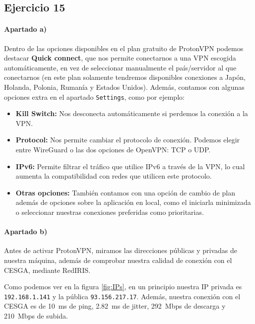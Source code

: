\subsection{Ejercicio 15}
\graphicspath{ {img/15} }

\paragraph{Apartado a)} Dentro de las opciones disponibles en el plan gratuito de ProtonVPN podemos destacar \textbf{Quick connect}, que nos permite conectarnos a una VPN escogida automáticamente, en vez de seleccionar manualmente el país/servidor al que conectarnos (en este plan solamente tendremos disponibles conexiones a Japón, Holanda, Polonia, Rumanía y Estados Unidos). Además, contamos con algunas opciones extra en el apartado \texttt{Settings}, como por ejemplo:

\begin{tcolorbox}[
    colback=orange!5!white,
    colframe=orange!75!black,
    title=Opciones relevantes en ProtonVPN
]
\begin{itemize}
    \item \textbf{Kill Switch:} Nos desconecta automáticamente si perdemos la conexión a la VPN.
    \item \textbf{Protocol:} Nos permite cambiar el protocolo de conexión. Podemos elegir entre WireGuard o las dos opciones de OpenVPN: TCP o UDP.
    \item \textbf{IPv6:} Permite filtrar el tráfico que utilice IPv6 a través de la VPN, lo cual aumenta la compatibilidad con redes que utilicen este protocolo.
    \item \textbf{Otras opciones:} También contamos con una opción de cambio de plan además de opciones sobre la aplicación en local, como el iniciarla minimizada o seleccionar nuestras conexiones preferidas como prioritarias.
\end{itemize}
\end{tcolorbox}


\paragraph{Apartado b)} Antes de activar ProtonVPN, miramos las direcciones públicas y privadas de nuestra máquina, además de comprobar nuestra calidad de conexión con el CESGA, mediante RedIRIS.

Como podemos ver en la figura \ref{fig:IPs}, en un principio nuestra IP privada es \\\texttt{192.168.1.141} y la pública \texttt{93.156.217.17}.
Además, nuestra conexión con el CESGA es de \SI{10}{ms} de ping, \SI{2.82}{ms} de jitter, \SI{292}{Mbps} de descarga y \SI{210}{Mbps} de subida.

